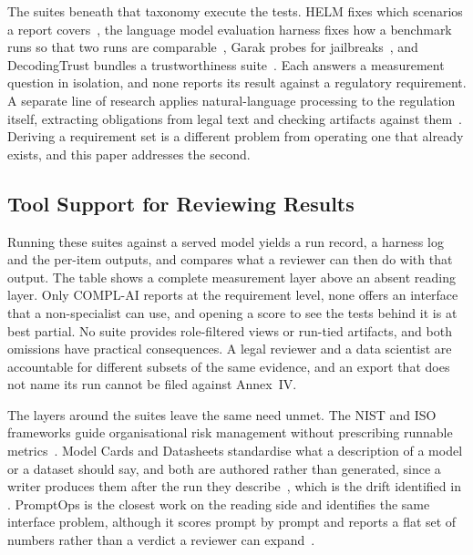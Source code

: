 \documentclass[10pt,conference]{IEEEtran}
\begin{document}
The suites beneath that taxonomy execute the tests.
HELM fixes which scenarios a report covers~\cite{liang2023helm}, the language model evaluation harness fixes how a benchmark runs so that two runs are comparable~\cite{gao2021lmevalharness}, Garak probes for jailbreaks~\cite{derczynski2024garak}, and DecodingTrust bundles a trustworthiness suite~\cite{wang2023decodingtrust}.
Each answers a measurement question in isolation, and none reports its result against a regulatory requirement.
A separate line of research applies natural-language processing to the regulation itself, extracting obligations from legal text and checking artifacts against them~\cite{abualhaija2025llmregextraction,amaral2022nlpcompliance,abualhaija2024regchange}.
Deriving a requirement set is a different problem from operating one that already exists, and this paper addresses the second.

\subsection{Tool Support for Reviewing Results}
Running these suites against a served model yields a run record, a harness log and the per-item outputs, and  compares what a reviewer can then do with that output.
The table shows a complete measurement layer above an absent reading layer.
Only COMPL-AI reports at the requirement level, none offers an interface that a non-specialist can use, and opening a score to see the tests behind it is at best partial.
No suite provides role-filtered views or run-tied artifacts, and both omissions have practical consequences.
A legal reviewer and a data scientist are accountable for different subsets of the same evidence, and an export that does not name its run cannot be filed against Annex~IV.

The layers around the suites leave the same need unmet.
The NIST and ISO frameworks guide organisational risk management without prescribing runnable metrics~\cite{nist2023airmf,iso42001_2023}.
Model Cards and Datasheets standardise what a description of a model or a dataset should say, and both are authored rather than generated, since a writer produces them after the run they describe~\cite{mitchell2019modelcard,gebru2021datasheets}, which is the drift identified in .
PromptOps is the closest work on the reading side and identifies the same interface problem, although it scores prompt by prompt and reports a flat set of numbers rather than a verdict a reviewer can expand~\cite{sunetnanta2025promptops}.
\end{document}

